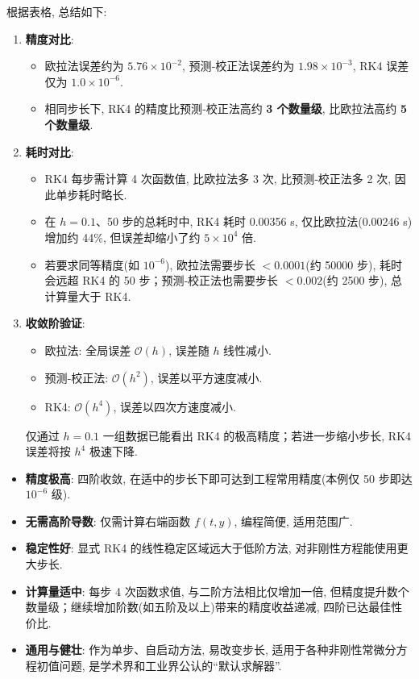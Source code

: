 \documentclass[zihao=-4,a4paper]{ctexart}
\begin{document}
根据表格, 总结如下:
\begin{enumerate}[rightmargin=0.5cm]
    \item \textbf{精度对比}: 
    \begin{itemize}
        \item 欧拉法误差约为 $5.76\times10^{-2}$, 预测‑校正法误差约为 $1.98\times10^{-3}$, RK4 误差仅为 $1.0\times10^{-6}$. 
        \item 相同步长下, RK4 的精度比预测‑校正法高约 \textbf{3 个数量级}, 比欧拉法高约 \textbf{5 个数量级}. 
    \end{itemize}
    
    \item \textbf{耗时对比}: 
    \begin{itemize}
        \item RK4 每步需计算 4 次函数值, 比欧拉法多 3 次, 比预测‑校正法多 2 次, 因此单步耗时略长. 
        \item 在 $h=0.1$、50 步的总耗时中, RK4 耗时 0.00356 s, 仅比欧拉法(0.00246 s)增加约 44\%, 但误差却缩小了约 $5\times10^4$ 倍. 
        \item 若要求同等精度(如 $10^{-6}$), 欧拉法需要步长 $<0.0001$(约 50000 步), 耗时会远超 RK4 的 50 步；预测‑校正法也需要步长 $<0.002$(约 2500 步), 总计算量大于 RK4. 
    \end{itemize}
    
    \item \textbf{收敛阶验证}: 
    \begin{itemize}
        \item 欧拉法: 全局误差 $\mathcal{O}(h)$, 误差随 $h$ 线性减小. 
        \item 预测‑校正法: $\mathcal{O}(h^2)$, 误差以平方速度减小. 
        \item RK4: $\mathcal{O}(h^4)$, 误差以四次方速度减小. 
    \end{itemize}
    仅通过 $h=0.1$ 一组数据已能看出 RK4 的极高精度；若进一步缩小步长, RK4 误差将按 $h^4$ 极速下降. 
\end{enumerate}

\begin{itemize}[rightmargin=0.5cm]
    \item \textbf{精度极高}: 四阶收敛, 在适中的步长下即可达到工程常用精度(本例仅 50 步即达 $10^{-6}$ 级). 
    \item \textbf{无需高阶导数}: 仅需计算右端函数 $f(t,y)$, 编程简便, 适用范围广. 
    \item \textbf{稳定性好}: 显式 RK4 的线性稳定区域远大于低阶方法, 对非刚性方程能使用更大步长. 
    \item \textbf{计算量适中}: 每步 4 次函数求值, 与二阶方法相比仅增加一倍, 但精度提升数个数量级；继续增加阶数(如五阶及以上)带来的精度收益递减, 四阶已达最佳性价比. 
    \item \textbf{通用与健壮}: 作为单步、自启动方法, 易改变步长, 适用于各种非刚性常微分方程初值问题, 是学术界和工业界公认的“默认求解器”. 
\end{itemize}
\end{document}
